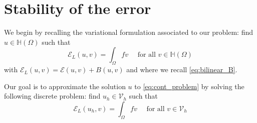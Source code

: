\documentclass[10 pt]{article}
\numberwithin{equation}{section}
\def\cE{\mathcal{E}}
\begin{document}
\section{Stability of the error}\label{sec:error}

We begin by recalling the variational formulation associated to our problem: find $u\in\mathbb H(\Omega)$ such that 
%
\begin{equation}\label{eq:cont_problem}
    \cE_{L}(u,v)=\int_{\Omega}f v \quad \text{ for all } v\in \mathbb H(\Omega)
\end{equation}
%
with $\cE_{L}(u,v)=\cE(u,v)+B(u,v)$ and where we recall \eqref{eq:bilinear_B}.

Our goal is to approximate the solution $u$ to \eqref{eq:cont_problem} by solving the following discrete problem: find $u_h\in \mathcal V_h$ such that
%
\begin{equation}\label{eq:discr_problem}
    \cE_{L}(u_h,v)=\int_{\Omega} f v \quad \text{ for all } v\in \mathcal V_h
\end{equation}
%
\end{document}
